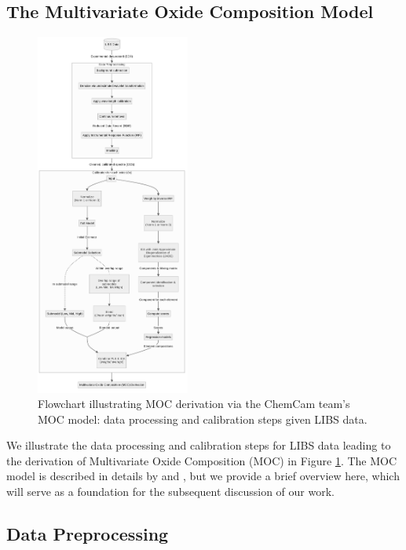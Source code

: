 \subsection{The Multivariate Oxide Composition Model}\label{sec:moc}
\begin{figure}[H]
    \centering
    \includegraphics[width=0.45\textwidth]{images/pipeline.png}
    \caption{Flowchart illustrating MOC derivation via the ChemCam team's MOC model: data processing and calibration steps given LIBS data.}
    \label{fig:libs_data_processing}
\end{figure}

We illustrate the data processing and calibration steps for LIBS data leading to the derivation of Multivariate Oxide Composition (MOC) in Figure \ref{fig:libs_data_processing}. The MOC model is described in details by \citet{cleggRecalibrationMarsScience2017} and \citet{andersonImprovedAccuracyQuantitative2017}, but we provide a brief overview here, which will serve as a foundation for the subsequent discussion of our work.

\subsection{Data Preprocessing}\label{sec:data_preprocessing}

